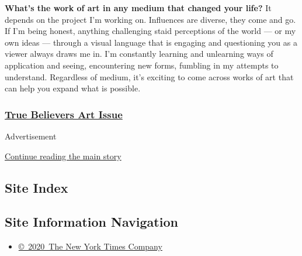 \textbf{What's the work of art in any medium that changed your life?} It
depends on the project I'm working on. Influences are diverse, they come
and go. If I'm being honest, anything challenging staid perceptions of
the world --- or my own ideas --- through a visual language that is
engaging and questioning you as a viewer always draws me in. I'm
constantly learning and unlearning ways of application and seeing,
encountering new forms, fumbling in my attempts to understand.
Regardless of medium, it's exciting to come across works of art that can
help you expand what is possible.

\hypertarget{true-believers-art-issue}{%
\subsubsection{\texorpdfstring{\href{https://www.nytimes3xbfgragh.onion/issue/t-magazine/2020/07/02/true-believers-art-issue}{True
Believers Art
Issue}}{True Believers Art Issue}}\label{true-believers-art-issue}}

Advertisement

\protect\hyperlink{after-bottom}{Continue reading the main story}

\hypertarget{site-index}{%
\subsection{Site Index}\label{site-index}}

\hypertarget{site-information-navigation}{%
\subsection{Site Information
Navigation}\label{site-information-navigation}}

\begin{itemize}
\tightlist
\item
  \href{https://help.nytimes3xbfgragh.onion/hc/en-us/articles/115014792127-Copyright-notice}{©~2020~The
  New York Times Company}
\end{itemize}

